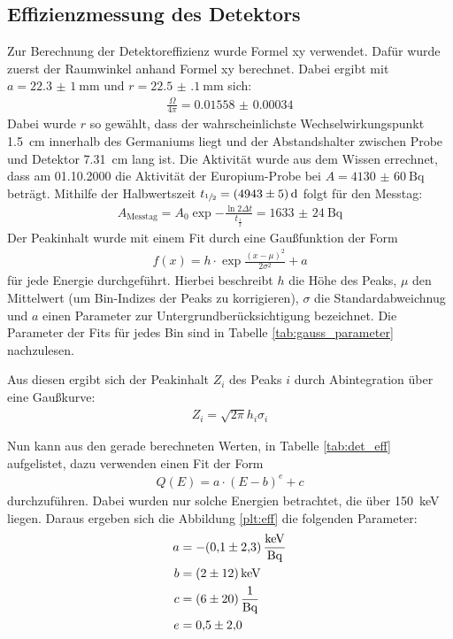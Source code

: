 \subsection{Effizienzmessung des Detektors}
\label{sec:Effizienzmessung}

Zur Berechnung der Detektoreffizienz wurde Formel xy verwendet.  %
Dafür wurde zuerst der Raumwinkel anhand Formel xy berechnet. Dabei  %
ergibt mit $a = \SI{22.3(10)}{\milli\meter}$ und $r = \SI{22.5(1)}{\milli\meter}$
sich:
\begin{align*}
  \frac{\Omega}{4\pi} = \num{0.01558(34)}
\end{align*}
Dabei wurde $r$ so gewählt, dass der wahrscheinlichste Wechselwirkungspunkt
\SI{1.5}{\centi\meter} innerhalb des Germaniums liegt und der Abstandshalter
zwischen Probe und Detektor \SI{7.31}{\centi\meter} lang ist.
Die Aktivität wurde aus dem Wissen errechnet, dass am 01.10.2000 die Aktivität
der Europium-Probe bei $A = \SI{4130(60)}{\becquerel}$ beträgt. Mithilfe der
Halbwertszeit $t_{\sfrac{1}{2}} = \SI{4943(5)}{\day}$ folgt für den Messtag:
\begin{align*}
    A_\text{Messtag} = A_0 \exp{-\frac{\ln{2} \Delta t}{t_\frac{1}{2}}}=\SI{1633(24)}{\becquerel}
\end{align*}
Der Peakinhalt wurde mit einem Fit durch eine Gaußfunktion der Form
\begin{align*}
	f\left(x\right) = h\cdot \exp{\frac{(x-\mu)^2}{2\sigma^2}} + a
\end{align*}
für jede Energie durchgeführt. Hierbei beschreibt $h$ die Höhe des Peaks, $\mu$
den Mittelwert (um Bin-Indizes der Peaks zu korrigieren), $\sigma$ die
Standardabweichnug und $a$ einen Parameter zur Untergrundberücksichtigung
bezeichnet. Die Parameter der Fits für jedes Bin sind in Tabelle
\ref{tab:gauss_parameter} nachzulesen.


\FloatBarrier

Aus diesen ergibt sich der Peakinhalt $Z_i$ des Peaks $i$ durch Abintegration
über eine Gaußkurve:
\begin{align*}
  Z_i = \sqrt{2\pi} h_i \sigma_i
\end{align*}

Nun kann aus den gerade berechneten Werten, in Tabelle \ref{tab:det_eff}
aufgelistet, dazu verwenden einen Fit der Form
\begin{align*}
  Q(E) = a \cdot (E - b)^e + c
\end{align*}
durchzuführen. Dabei wurden nur solche Energien betrachtet, die über
\SI{150}{\kilo\electronvolt} liegen. Daraus ergeben sich die Abbildung
\ref{plt:eff} die folgenden Parameter:
\begin{align*}
  a &= -\SI{0.1(23)}{\kilo\electronvolt\per\becquerel} \\
  b &= \SI{2(12)}{\kilo\electronvolt} \\
  c &= \SI{6(20)}{\raiseto{-1}\becquerel} \\
  e &= \num{0.5(20)}
\end{align*}

